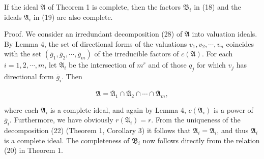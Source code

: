 If the ideal $\mathfrak{A}$ of Theorem 1 is complete, then the factors $\mathfrak{B}_i$ in (18) and the ideals $\mathfrak{A}_i$ in (19) are also complete.

Proof. We consider an irredundant decomposition (28) of $\mathfrak{A}$ into valuation ideals. By Lemma 4, the set of directional forms of the valuations $v_1, v_2, \cdots, v_n$ coincides with the set $(\bar{g}_1, \bar{g}_2, \cdots, \bar{g}_m)$ of the irreducible factors of $c(\mathfrak{A})$. For each $i=1, 2, \cdots, m$, let $\mathfrak{A}_i$ be the intersection of $m^r$ and of those $q_j$ for which $v_j$ has directional form $\bar{g}_i$. Then

$$\mathfrak{A} = \bar{\mathfrak{A}}_1 \cap \bar{\mathfrak{A}}_2 \cap \cdots \cap \bar{\mathfrak{A}}_m,$$

where each $\mathfrak{A}_i$ is a complete ideal, and again by Lemma 4, $c(\mathfrak{A}_i)$ is a power of $\bar{g}_i$. Furthermore, we have obviously $r(\mathfrak{A}_i) = r$. From the uniqueness of the decomposition (22) (Theorem 1, Corollary 3) it follows that $\mathfrak{A}_i = \mathfrak{A}_i$, and thus $\mathfrak{A}_i$ is a complete ideal. The completeness of $\mathfrak{B}_i$ now follows directly from the relation (20) in Theorem 1.